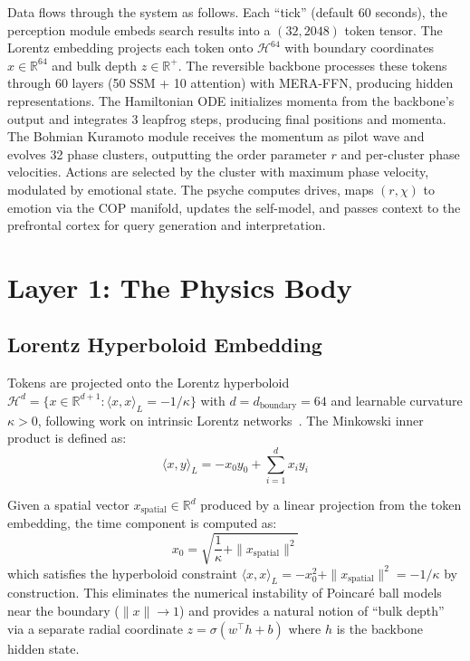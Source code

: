 \documentclass[11pt,a4paper,twocolumn]{article}
\begin{document}
Data flows through the system as follows.
Each ``tick'' (default 60 seconds), the perception module embeds search results into a $(32, 2048)$ token tensor.
The Lorentz embedding projects each token onto $\mathcal{H}^{64}$ with boundary coordinates $x \in \mathbb{R}^{64}$ and bulk depth $z \in \mathbb{R}^+$.
The reversible backbone processes these tokens through 60 layers (50 SSM + 10 attention) with MERA-FFN, producing hidden representations.
The Hamiltonian ODE initializes momenta from the backbone's output and integrates 3 leapfrog steps, producing final positions and momenta.
The Bohmian Kuramoto module receives the momentum as pilot wave and evolves 32 phase clusters, outputting the order parameter $r$ and per-cluster phase velocities.
Actions are selected by the cluster with maximum phase velocity, modulated by emotional state.
The psyche computes drives, maps $(r, \chi)$ to emotion via the COP manifold, updates the self-model, and passes context to the prefrontal cortex for query generation and interpretation.

\section{Layer 1: The Physics Body}

\subsection{Lorentz Hyperboloid Embedding}

Tokens are projected onto the Lorentz hyperboloid $\mathcal{H}^d = \{x \in \mathbb{R}^{d+1} : \langle x,x\rangle_L = -1/\kappa\}$ with $d = d_{\mathrm{boundary}} = 64$ and learnable curvature $\kappa > 0$, following work on intrinsic Lorentz networks~\cite{ilnn2026}.
The Minkowski inner product is defined as:
\begin{equation}
\langle x, y \rangle_L = -x_0 y_0 + \sum_{i=1}^{d} x_i y_i
\label{eq:minkowski}
\end{equation}

Given a spatial vector $x_{\mathrm{spatial}} \in \mathbb{R}^d$ produced by a linear projection from the token embedding, the time component is computed as:
\begin{equation}
x_0 = \sqrt{\frac{1}{\kappa} + \|x_{\mathrm{spatial}}\|^2}
\label{eq:time_component}
\end{equation}
which satisfies the hyperboloid constraint $\langle x, x \rangle_L = -x_0^2 + \|x_{\mathrm{spatial}}\|^2 = -1/\kappa$ by construction.
This eliminates the numerical instability of Poincar\'e ball models near the boundary ($\|x\| \to 1$) and provides a natural notion of ``bulk depth'' via a separate radial coordinate $z = \sigma(w^\top h + b)$ where $h$ is the backbone hidden state.
\end{document}
